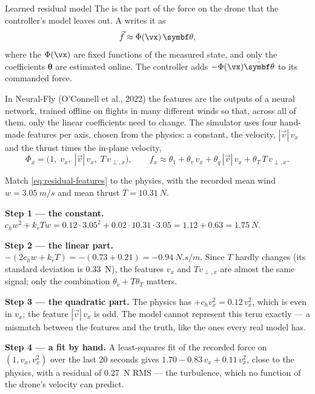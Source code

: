 \begin{definition}{Learned residual model}
The  is the part of the force on the drone that the controller's model leaves out. A  writes it as
\begin{equation}\label{eq:residual-model}
  \vec f \approx \Phi(\vx)\,\symbf\theta ,
\end{equation}
where the  $\Phi(\vx)$ are fixed functions of the measured state, and only the coefficients $\symbf\theta$ are estimated online. The controller adds $-\Phi(\vx)\hat{\symbf\theta}$ to its commanded force.
\end{definition}

In Neural-Fly (O'Connell et al., 2022) the features are the outputs of a neural network, trained offline on flights in many different winds so that, across all of them, only the linear coefficients need to change. The simulator uses four hand-made features per axis, chosen from the physics: a constant, the velocity, $|\vec v|\,v_x$ and the thrust times the in-plane velocity,
\begin{equation}\label{eq:residual-features}
  \Phi_x = \big(1,\; v_x,\; |\vec v|\,v_x,\; T\,v_{\perp,x}\big) ,\qquad f_x \approx \theta_1 + \theta_v\,v_x + \theta_q\,|\vec v|\,v_x + \theta_T\,T\,v_{\perp,x} .
\end{equation}

\begin{example}
\label{ex:residual-coeffs}
Match \cref{eq:residual-features} to the physics, with the recorded mean wind $w = \SI{3.05}{m/s}$ and mean thrust $T = \SI{10.31}{N}$.

\textbf{Step 1 — the constant.} $c_hw^2 + k_rTw = 0.12 \cdot 3.05^2 + 0.02 \cdot 10.31 \cdot 3.05 = 1.12 + 0.63 = \SI{1.75}{N}$.

\textbf{Step 2 — the linear part.} $-(2c_hw + k_rT) = -(0.73 + 0.21) = \SI{-0.94}{N.s/m}$. Since $T$ hardly changes (its standard deviation is \SI{0.33}{N}), the features $v_x$ and $T v_{\perp,x}$ are almost the same signal; only the combination $\theta_v + T\theta_T$ matters.

\textbf{Step 3 — the quadratic part.} The physics has $+c_hv_x^2 = 0.12\,v_x^2$, which is even in $v_x$; the feature $|\vec v|\,v_x$ is odd. The model cannot represent this term exactly — a mismatch between the features and the truth, like the ones every real model has.

\textbf{Step 4 — a fit by hand.} A least-squares fit of the recorded force on $(1, v_x, v_x^2)$ over the last 20 seconds gives $1.70 - 0.83\,v_x + 0.11\,v_x^2$, close to the physics, with a residual of \SI{0.27}{N} RMS — the turbulence, which no function of the drone's velocity can predict.
\end{example}

